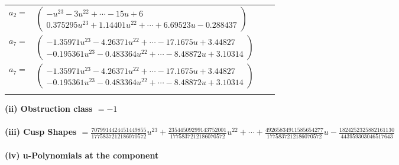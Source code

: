 \documentclass[1p]{elsarticle_modified}
\theoremstyle{definition}
\begin{document}
\begin{tabular}{m{7pt} m{180pt} m{7pt} m{180pt} }
\flushright $a_{2}=$&$\begin{pmatrix}- u^{23}-3 u^{22}+\cdots-15 u+6\\0.375295 u^{23}+1.14401 u^{22}+\cdots+6.69523 u-0.288437\end{pmatrix}$ \\
\flushright $a_{7}=$&$\begin{pmatrix}-1.35971 u^{23}-4.26371 u^{22}+\cdots-17.1675 u+3.44827\\-0.195361 u^{23}-0.483364 u^{22}+\cdots-8.48872 u+3.10314\end{pmatrix}$\\ \flushright $a_{7}=$&$\begin{pmatrix}-1.35971 u^{23}-4.26371 u^{22}+\cdots-17.1675 u+3.44827\\-0.195361 u^{23}-0.483364 u^{22}+\cdots-8.48872 u+3.10314\end{pmatrix}$\\&\end{tabular}
\flushleft \textbf{(ii) Obstruction class $= -1$}\\~\\
\flushleft \textbf{(iii) Cusp Shapes $= \frac{7079914424451449855}{1775837212186070572} u^{23}+\frac{23544509299143752001}{1775837212186070572} u^{22}+\cdots+\frac{49265834911585654277}{1775837212186070572} u-\frac{1824252325882161130}{443959303046517643}$}\\~\\
\newpage\renewcommand{\arraystretch}{1}
\flushleft \textbf{(iv) u-Polynomials at the component}\newline \\
\end{document}
